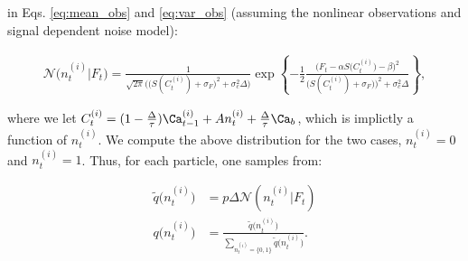 in Eqs. \ref{eq:mean_obs} and \ref{eq:var_obs} (assuming the nonlinear observations and signal dependent noise model): 


\begin{multline} \label{eq:q_nn}
\mathcal{N}\big(n_t^{(i)} | F_t\big) = \frac{1}{\sqrt{2 \pi} \big(\big(S(
C_t^{(i)}) + \sigma_F\big)^2 + \sigma_c^2 \Delta\big)}  \exp \left\{-\frac{1}{2}\frac{\big(F_t - \alpha S\big(C_t^{(i)}\big) - \beta \big)^2}{\big(S(C_t^{(i)}) + \sigma_F)\big)^2 + \sigma_c^2 \Delta}\right\},
\end{multline}

\noindent where we let $C_t^{(i)}=(1-\frac{\Delta}{\tau}) \Ca_{t-1}^{(i)} + A n_t^{(i)} + \frac{\Delta}{\tau} \Ca_b$, which is implictly a function of $n_t^{(i)}$.  We compute the above distribution for the two cases, $n_t^{(i)}=0$ and $n_t^{(i)}=1$.  Thus, for each particle, one samples from:

\begin{subequations} \label{aeq:qn2}
\begin{align}
\widetilde{q}\big(n_t^{(i)}\big)&=p \Delta \mathcal{N}(n_t^{(i)} | F_t)\\
q\big(n_t^{(i)}\big)&=\frac{\widetilde{q}\big(n_t^{(i)}\big)}{\sum_{n_t^{(i)}=\{0,1\}} \widetilde{q}\big(n_t^{(i)}\big)}.
\end{align}
\end{subequations}

